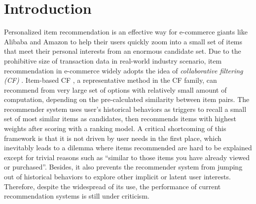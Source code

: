 \section{Introduction}
\label{sec:intro}

Personalized item recommendation %
is an effective way for %
e-commerce giants like Alibaba and Amazon
to help their users quickly zoom into a small set of items 
that meet their personal interests from an enormous candidate set. 
Due to the prohibitive size of transaction data in real-world industry 
scenario, item recommendation in e-commerce widely adopts the 
idea of \textit{collaborative filtering (CF)} \cite{linden2003amazon}.
Item-based CF \cite{sarwar2001item}, 
a representative method in the CF family,
can recommend from very large set of options with relatively small amount of computation, 
depending on the pre-calculated similarity between item pairs.
The recommender system uses user's historical behaviors as triggers to recall a small set of most similar items as candidates, 
then recommends items with highest weights after scoring with a ranking model. 
A critical shortcoming of this framework is that it is not driven by user needs in the first place, 
which inevitably leads to a dilemma where items recommended are hard to be explained 
except for trivial reasons such as ``similar to those items you have already viewed or purchased''.
Besides, it also prevents the recommender system from jumping out of 
historical behaviors to explore other implicit or latent user interests.
Therefore, despite the widespread of its use,
the performance of current recommendation systems is still under criticism. 
